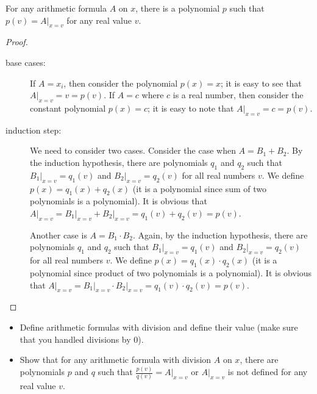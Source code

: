 \begin{theorem}
  For any arithmetic formula $A$ on $x$, there is a polynomial
  $p$ such that $p(v) = A\big\rvert_{x = v}$ for any real value $v$.
\end{theorem}
\begin{proof}
  \begin{description}
    \item[base cases:] If $A = x_i$, then consider the polynomial $p(x) = x$;
      it is easy to see that $A\big\rvert_{x = v} = v = p(v)$.
      If $A = c$ where $c$ is a real number, then consider the constant
      polynomial  $p(x) = c$; it is easy to note that $A\big\rvert_{x = v} = c =
       p(v)$.
    \item[induction step:] We need to consider two cases. Consider the case when
      $A = B_1 + B_2$. By the induction hypothesis, there are polynomials $q_1$
      and $q_2$ such that $B_1\big\rvert_{x = v} = q_1(v)$ and
      $B_2\big\rvert_{x = v} = q_2(v)$ for all real numbers $v$.
      We define $p(x) = q_1(x) + q_2(x)$ (it is a polynomial since sum of
      two polynomials is a polynomial). It is obvious that
      $A\big\rvert_{x = v} = B_1\big\rvert_{x = v} + B_2\big\rvert_{x = v} =
      q_1(v) + q_2(v) = p(v)$.

      Another case is $A = B_1 \cdot B_2$. Again, by the induction hypothesis,
      there are polynomials $q_1$ and $q_2$ such that
      $B_1\big\rvert_{x = v} = q_1(v)$ and
      $B_2\big\rvert_{x = v} = q_2(v)$ for all real numbers $v$.
      We define $p(x) = q_1(x) \cdot q_2(x)$ (it is a polynomial since product of
      two polynomials is a polynomial). It is obvious that
      $A\big\rvert_{x = v} = B_1\big\rvert_{x = v} \cdot B_2\big\rvert_{x = v} =
      q_1(v) \cdot q_2(v) = p(v)$.
  \end{description}
\end{proof}

\begin{exercise}
  \begin{itemize}
    \item Define arithmetic formulas with division and define their value (make sure
      that you handled divisions by $0$).

    \item Show that for any arithmetic formula with division $A$ on $x$,
      there are polynomials $p$ and $q$ such that $\frac{p(v)}{q(v)} =
      A\big\rvert_{x = v}$ or $A\big\rvert_{x = v}$ is not defined for
      any real value $v$.
  \end{itemize}
\end{exercise}


